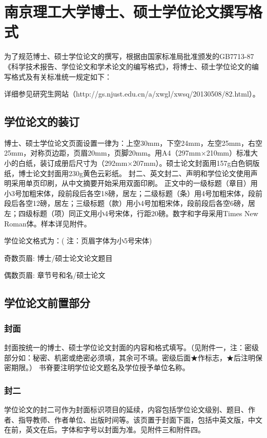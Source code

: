 \chapter{南京理工大学博士、硕士学位论文撰写格式}
\label{app:format}
为了规范博士、硕士学位论文的撰写，根据由国家标准局批准颁发的GB7713-87《科学技术报告、学位论文和学术论文的编写格式》，将博士、硕士学位论文的编写格式及有关标准统一规定如下：

详细参见研究生网站（http://gs.njust.edu.cn/a/xwgl/xwsq/20130508/82.html）。

\section{学位论文的装订}

博士、硕士学位论文页面设置一律为：上空30mm，下空24mm，左空25mm，右空25mm，对称页边距，页眉20mm，页脚20mm。用A4（297mm×210mm）标准大小的白纸，装订成册后尺寸为（292mm×207mm）。硕士论文封面用157g白色铜版纸，博士论文封面用230g黄色云彩纸。
封二、英文封二、声明和学位论文使用声明采用单页印刷，从中文摘要开始采用双面印刷。
正文中的一级标题（章目）用小3号加粗宋体，段前段后各空18磅，居左；二级标题（条）用4号加粗宋体，段前段后各空12磅，居左；三级标题（款）用小4号加粗宋体，段前段后各空6磅，居左；四级标题（项）同正文用小4号宋体，行距20磅。数字和字母采用Times New Roman体。样本详见附件。

学位论文格式为：( 注：页眉字体为小5号宋体)

奇数页眉:
博士/硕士论文\hspace{40pt}论文题目

偶数页眉:
章节号和名\hspace{40pt}/硕士论文


\section{学位论文前置部分}
\subsection{封面}
封面按统一的博士、硕士学位论文封面的内容和格式填写。（见附件一，注：密级部分如：秘密、机密或绝密必须填，其余可不填。密级后面★作标志，★后注明保密期限。）
书脊要注明学位论文题名及学位授予单位名称。

\subsection{封二}
学位论文的封二可作为封面标识项目的延续，内容包括学位论文级别、题目、作者、指导教师、作者单位、出版时间等。该页置于封面下面，包括中英文版，中文在前，英文在后。字体和字号以封面为准。见附件三和附件四。

